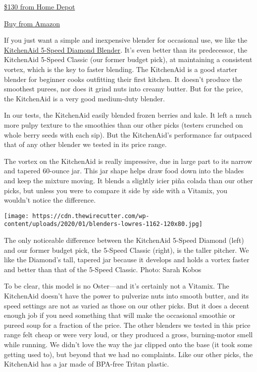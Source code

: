 \href{https://www.nytimes3xbfgragh.onion/wirecutter/out/link/35968/159787/4/109197?merchant=Home\%20Depot}{\$130
from Home Depot}

\href{https://www.nytimes3xbfgragh.onion/wirecutter/out/link/35968/158229/4/109197?merchant=Amazon}{Buy
from Amazon}

If you just want a simple and inexpensive blender for occasional use, we
like the
\href{https://www.nytimes3xbfgragh.onion/wirecutter/out/link/35968/159119/4/109206/?merchant=Bed\%20Bath\%20\%26\%20Beyond}{KitchenAid
5-Speed Diamond Blender}. It's even better than its predecessor, the
KitchenAid 5-Speed Classic (our former budget pick), at maintaining a
consistent vortex, which is the key to faster blending. The KitchenAid
is a good starter blender for beginner cooks outfitting their first
kitchen. It doesn't produce the smoothest purees, nor does it grind nuts
into creamy butter. But for the price, the KitchenAid is a very good
medium-duty blender.

In our tests, the KitchenAid easily blended frozen berries and kale. It
left a much more pulpy texture to the smoothies than our other picks
(testers crunched on whole berry seeds with each sip). But the
KitchenAid's performance far outpaced that of any other blender we
tested in its price range.

The vortex on the KitchenAid is really impressive, due in large part to
its narrow and tapered 60-ounce jar. This jar shape helps draw food down
into the blades and keep the mixture moving. It blends a slightly icier
piña colada than our other picks, but unless you were to compare it side
by side with a Vitamix, you wouldn't notice the difference.

\texttt{[image: https://cdn.thewirecutter.com/wp-content/uploads/2020/01/blenders-lowres-1162-120x80.jpg]}

The only noticeable difference between the KitchenAid 5-Speed Diamond
(left) and our former budget pick, the 5-Speed Classic (right), is the
taller pitcher. We like the Diamond's tall, tapered jar because it
develops and holds a vortex faster and better than that of the 5-Speed
Classic. Photo: Sarah Kobos

To be clear, this model is no Oster---and it's certainly not a Vitamix.
The KitchenAid doesn't have the power to pulverize nuts into smooth
butter, and its speed settings are not as varied as those on our other
picks. But it does a decent enough job if you need something that will
make the occasional smoothie or pureed soup for a fraction of the price.
The other blenders we tested in this price range felt cheap or were very
loud, or they produced a gross, burning-motor smell while running. We
didn't love the way the jar clipped onto the base (it took some getting
used to), but beyond that we had no complaints. Like our other picks,
the KitchenAid has a jar made of BPA-free Tritan plastic.

